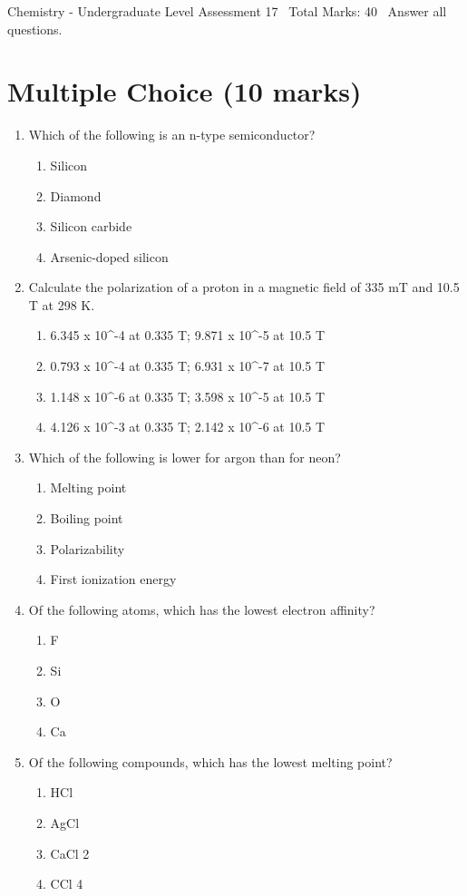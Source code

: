 \documentclass[12pt]{article}
\begin{document}
\begin{center}
Chemistry - Undergraduate Level Assessment 17 \
Total Marks: 40 \
Answer all questions.
\end{center}

\section*{Multiple Choice (10 marks)}
\begin{enumerate}[label=\arabic*.]
\item Which of the following is an n-type semiconductor?
\begin{enumerate}[label=(\alph*)]
    \item Silicon
    \item Diamond
    \item Silicon carbide
    \item Arsenic-doped silicon
\end{enumerate}
\item Calculate the polarization of a proton in a magnetic field of 335 mT and 10.5 T at 298 K.
\begin{enumerate}[label=(\alph*)]
    \item 6.345 x 10^-4 at 0.335 T; 9.871 x 10^-5 at 10.5 T
    \item 0.793 x 10^-4 at 0.335 T; 6.931 x 10^-7 at 10.5 T
    \item 1.148 x 10^-6 at 0.335 T; 3.598 x 10^-5 at 10.5 T
    \item 4.126 x 10^-3 at 0.335 T; 2.142 x 10^-6 at 10.5 T
\end{enumerate}
\item Which of the following is lower for argon than for neon?
\begin{enumerate}[label=(\alph*)]
    \item Melting point
    \item Boiling point
    \item Polarizability
    \item First ionization energy
\end{enumerate}
\item Of the following atoms, which has the lowest electron affinity?
\begin{enumerate}[label=(\alph*)]
    \item F
    \item Si
    \item O
    \item Ca
\end{enumerate}
\item Of the following compounds, which has the lowest melting point?
\begin{enumerate}[label=(\alph*)]
    \item HCl
    \item AgCl
    \item CaCl 2
    \item CCl 4
\end{enumerate}
\end{enumerate}
\end{document}
